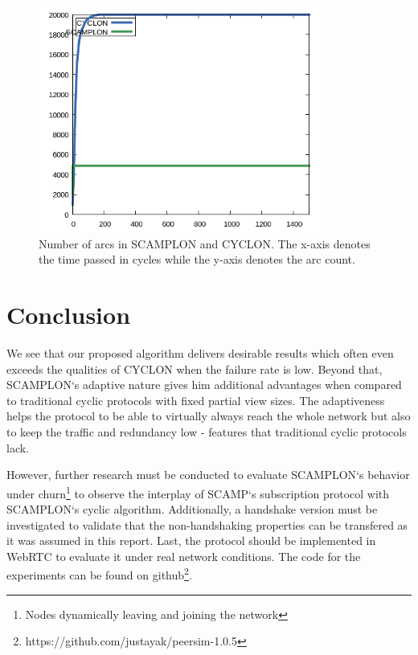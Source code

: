 \documentclass[11pt, english, screen]{report-rd-info}
\begin{document}
\begin{figure}[H]
    \centering
    \includegraphics[width=9.3cm]{Images/statistics/scamplon_1000_c3/arc_count/p}
    \caption{Number of arcs in SCAMPLON and CYCLON. The x-axis denotes the time passed in cycles while the y-axis denotes the arc count.}
    \label{fig:narc}
\end{figure}

\section{Conclusion}

We see that our proposed algorithm delivers desirable results which often even exceeds the qualities of CYCLON when the failure rate is low.
Beyond that, SCAMPLON`s adaptive nature gives him additional advantages when compared to traditional cyclic protocols with fixed partial view sizes.
The adaptiveness helps the protocol to be able to virtually always reach the whole network but also to keep the traffic and redundancy low - features that traditional cyclic protocols lack.

However, further research must be conducted to evaluate SCAMPLON`s behavior under churn\footnote{Nodes dynamically leaving and joining the network} to observe the interplay of SCAMP`s subscription protocol with SCAMPLON`s cyclic algorithm.
Additionally, a handshake version must be investigated to validate that the non-handshaking properties can be transfered as it was assumed in this report.
Last, the protocol should be implemented in WebRTC to evaluate it under real network conditions.
The code for the experiments can be found on github\footnote{https://github.com/justayak/peersim-1.0.5}.

\end{document}
